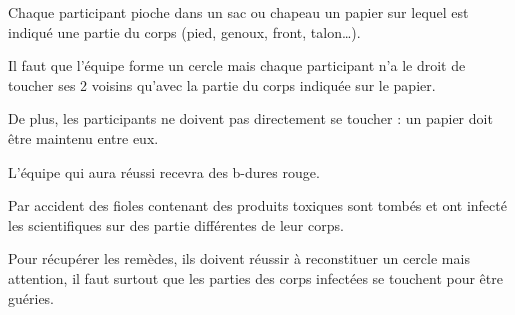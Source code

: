 \documentclass{grand-jeu}
\begin{document}
\begin{liste-materiel}
\end{liste-materiel}

\begin{regles}
Chaque participant pioche dans un sac ou chapeau un papier sur lequel est indiqué une partie du corps (pied, genoux, front, talon…).

Il faut que l’équipe forme un cercle mais chaque participant n’a le droit de toucher ses 2 voisins qu’avec la partie du corps indiquée sur le papier.

De plus, les participants ne doivent pas directement se toucher : un papier doit être maintenu entre eux.

L’équipe qui aura réussi recevra des b-dures rouge.
\end{regles}

\begin{imaginaire}
Par accident des fioles contenant des produits toxiques sont tombés et ont infecté les scientifiques sur des partie différentes de leur corps.

Pour récupérer les remèdes, ils doivent réussir à reconstituer un cercle mais attention, il faut surtout que les parties des corps infectées se touchent pour être guéries.
\end{imaginaire}

\begin{moments-stop}
\end{moments-stop}
\end{document}

